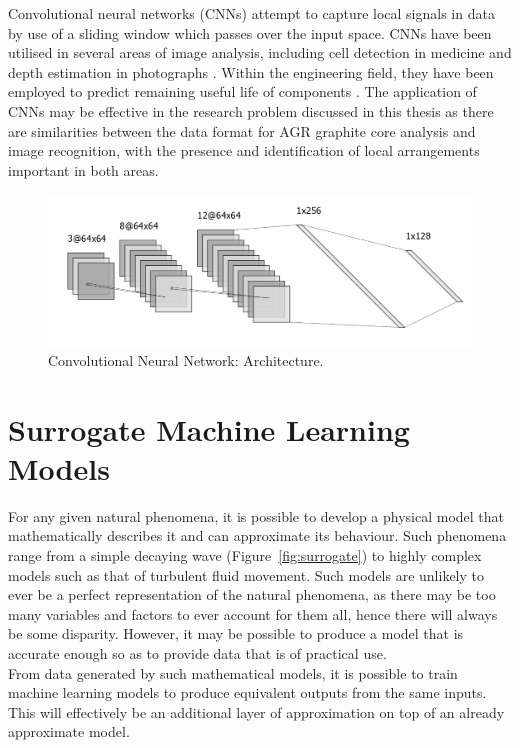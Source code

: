 Convolutional neural networks (CNNs) attempt to capture local signals in data by use of a sliding window which passes over the input space. CNNs have been utilised in several areas of image analysis, including cell detection in medicine \cite{xie2015beyond} and depth estimation in photographs \cite{li2015depth}. Within the engineering field, they have been employed to predict remaining useful life of components \cite{babu2016deep}. The application of CNNs may be effective in the research problem discussed in this thesis as there are similarities between the data format for AGR graphite core analysis and image recognition, with the presence and identification of local arrangements important in both areas.
\\

\begin{figure}[p]
	\centering
	\includegraphics[scale=0.45]{Figures/cnn_arch.png}
	\caption{Convolutional Neural Network: Architecture.}
	\label{fig:cnn}
\end{figure}

\section{Surrogate Machine Learning Models} \label{Surrogate}

For any given natural phenomena, it is possible to develop a physical model that mathematically describes it and can approximate its behaviour. Such phenomena range from a simple decaying wave (Figure~\ref{fig:surrogate}) to highly complex models such as that of turbulent fluid movement. Such models are unlikely to ever be a perfect representation of the natural phenomena, as there may be too many variables and factors to ever account for them all, hence there will always be some disparity. However, it may be possible to produce a model that is accurate enough so as to provide data that is of practical use.
\\

\noindent
From  data generated by such mathematical models, it is possible to train machine learning models to produce equivalent outputs from the same inputs. This will effectively be an additional layer of approximation on top of an already approximate model.
\\

